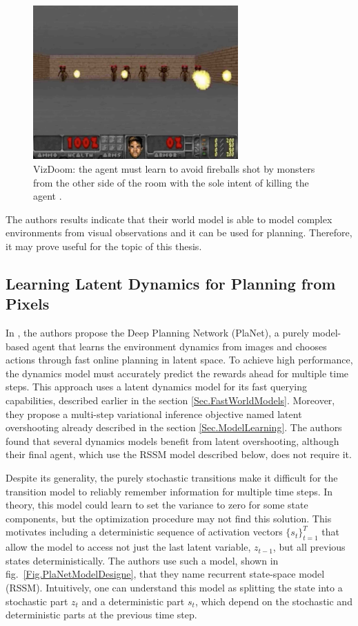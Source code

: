\begin{figure}[H]
\includegraphics[width=0.7\textwidth,keepaspectratio]{figures/VizDoom.png}
\caption[VizDoom]{VizDoom: the agent must learn to avoid fireballs shot by monsters from the other side of the room with the sole intent of killing the agent \protect\cite{Algo.WorldModels}.}
\label{Fig.VizDoom}
\end{figure}

The authors results indicate that their world model is able to model complex environments from visual observations and it can be used for planning. Therefore, it may prove useful for the topic of this thesis.

\subsection{Learning Latent Dynamics for Planning from Pixels}

In \cite{Algo.PlaNet}, the authors propose the Deep Planning Network (PlaNet), a purely model-based agent that learns the environment dynamics from images and chooses actions through fast online planning in latent space. To achieve high performance, the dynamics model must accurately predict the rewards ahead for multiple time steps. This approach uses a latent dynamics model for its fast querying capabilities, described earlier in the section \ref{Sec.FastWorldModels}. Moreover, they propose a multi-step variational inference objective named latent overshooting already described in the section \ref{Sec.ModelLearning}. The authors found that several dynamics models benefit from latent overshooting, although their final agent, which use the RSSM model described below, does not require it.

Despite its generality, the purely stochastic transitions make it difficult for the transition model to reliably remember information for multiple time steps. In theory, this model could learn to set the variance to zero for some state components, but the optimization procedure may not find this solution. This motivates including a deterministic sequence of activation vectors $\{s_t\}^T_{t=1}$ that allow the model to access not just the last latent variable, $z_{t-1}$, but all previous states deterministically. The authors use such a model, shown in fig.~\ref{Fig.PlaNetModelDesigne}, that they name recurrent state-space model (RSSM). Intuitively, one can understand this model as splitting the state into a stochastic part $z_t$ and a deterministic part $s_t$, which depend on the stochastic and deterministic parts at the previous time step.

